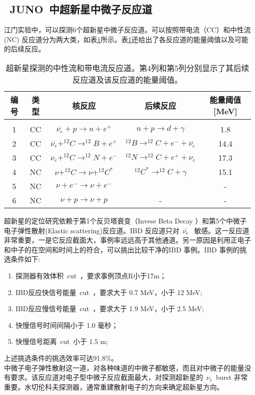 \subsection{~JUNO~中超新星中微子反应道}
江门实验中，可以探测6个超新星中微子反应道。可以按照带电流（CC）和中性流(NC) 反应道分为两大类，如表\ref{tab:t61}所示。表\ref{tab:t61}还给出了各反应道的能量阈值以及可能的后续反应。
\begin{table}[htbp]
\centering  %
\begin{tabular}{ccccc}  %
\hline
 编号&类型 &核反应 &后续反应 &能量阈值[MeV] \\ \hline  %
\\   1& CC & $ \bar{\nu_{e}}  + p \rightarrow n + e^{+} $  & $ n+p \rightarrow d + \gamma $ &1.8%
\\   2& CC& $ \bar{\nu_{e}}   +^{12}C \rightarrow ^{12}B+e^{+} $ & $^{12}B\rightarrow^{12}C+e^{-}+ \bar{\nu_{e}}$ &14.4%
\\   3&CC & $ \nu_{e}+^{12}C \rightarrow ^{12}N+e^{-}$ &  $^{12}N\rightarrow^{12}C+e^{+}+ \nu_{e}$   &17.3%
\\   4& NC&$\nu+^{12}C \rightarrow \nu+ ^{12}C^{*}$ &  $^{12}C^{*}\rightarrow^{12}C+\gamma  $&15.1%
\\   5& NC&$\nu+e^{-} \rightarrow \nu+e^{-}$& \text{-} &-%
\\   6& NC& $\nu+p \rightarrow \nu+p $ & - &-%
\\ \hline
\end{tabular}
\caption{超新星探测的中性流和带电流反应道。第4列和第5列分别显示了其后续反应道及该反应道的能量阈值。}
\label{tab:t61}
\end{table}
超新星的定位研究依赖于第1个反贝塔衰变（Invese Beta Decay ）和第5个中微子电子弹性散射(Elastic scattering)反应道。IBD 反应道只对~$\bar{\nu_{e}}$~ 敏感。这一反应道非常重要，一是它反应截面大，事例率远远高于其他通道。另一原因是利用正电子和中子的在空间和时间上的符合，可以挑出比较干净的IBD 事例。IBD 事例的挑选条件如下\citep{an2015neutrino}:
\begin{enumerate}
\item 探测器有效体积~cut~，要求事例顶点R小于17m；
\item IBD反应快信号能量~cut~，要求大于 0.7 MeV，小于 12 MeV;
\item IBD反应慢信号能量~cut~，要求大于 1.9 MeV，小于 2.5 MeV;
\item 快慢信号时间间隔小于 1.0 毫秒；
\item 快慢信号距离~cut~小于 1.5 m;
\end{enumerate}
上述挑选条件的挑选效率可达91.8\%。\\
中微子电子弹性散射这一道，对各种味道的中微子都敏感，而且对中微子的能量没有要求。该反应道对电子型中微子反应截面最大，对探测超新星的~$\nu_e$~burst 非常重要。水切伦科夫探测器，通常重建散射电子的方向来确定超新星方向。

